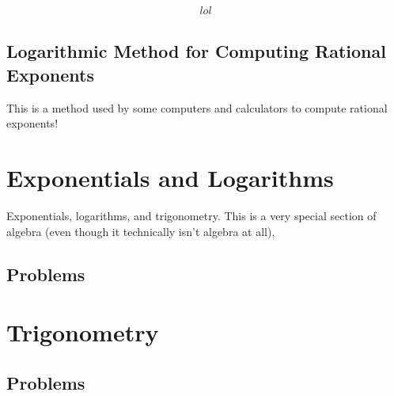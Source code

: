 \documentclass{scrbook}
\theoremstyle{definition}
\begin{document}
\begin{align*}
  lol
\end{align*}

\subsection{Logarithmic Method for Computing Rational Exponents}

This is a method used by some computers and calculators to compute rational exponents!

\section{Exponentials and Logarithms}

Exponentials, logarithms, and trigonometry. This is a very special section of algebra (even though it technically isn't algebra at all), 

\subsection{Problems}

\section{Trigonometry}

\subsection{Problems}

\printbibliography
\end{document}

